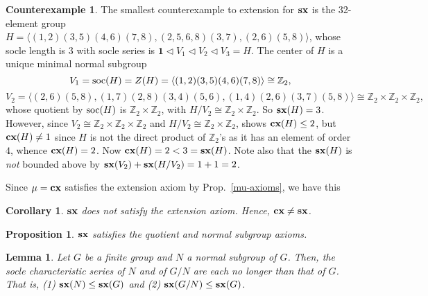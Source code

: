 \documentclass[a4paper,11pt]{amsart}
\newtheorem{lemma}[theorem]{Lemma}
\newtheorem{proposition}[theorem]{Proposition}
\newtheorem{corollary}[theorem]{Corollary}
\theoremstyle{definition}
\newtheorem{counterexample}[example]{Counterexample}
\newcommand{\cx}{\mbox{\bf cx}}
\newcommand{\sx}{{\bf sx}}
\newcommand{\soc}{\mbox{\rm soc}}
\newcommand{\Z}{\mathbb{Z}}
\newcommand{\1}{{\mathbf 1}}
\begin{document}
\begin{counterexample}
The smallest counterexample to extension for $\sx$ is the 32-element group 
$H=\langle (1,2)(3,5)(4,6)
      (7,8), (2,5,6,8)(3,7), (2,6)(5,8)\rangle$, whose 
 socle length is $3$ with socle series is $\1 \lhd V_1 \lhd V_2 \lhd V_3=H$. 
 The center of $H$ is a unique minimal normal subgroup $$V_1=\soc(H)=Z(H)=\langle (1,2)(3,5)(4,6)(7,8)\rangle\cong \Z_2,$$
      $$V_2=\langle (2,6)(5,8), (1,7)(2,8)(3,4)(5,6), (1,4)(2,6)(3,7)(5,8)\rangle\cong \Z_2\times\Z_2\times \Z_2,$$ whose quotient by $\soc(H)$ is $\Z_2\times \Z_2$, with $H/V_2\cong \Z_2\times \Z_2$. So $\sx(H)=3$.
      However, since
	$V_2\cong \Z_2\times\Z_2\times \Z_2$ and $H/V_2\cong\Z_2\times \Z_2$, shows $\cx(H)\leq 2$,
	 but $\cx(H)\neq 1$ since $H$ is not the direct product of $\Z_2$'s as it has an element of order $4$, whence $\cx(H)=2$.
	Now $\cx(H)=2<3=\sx(H)$. Note also that the $\sx(H)$ is {\em not} bounded above by $\sx(V_2)+\sx(H/V_2)=1+1=2$.
\end{counterexample}
Since $\mu=\cx$ satisfies the extension axiom by Prop.~\ref{mu-axioms}, we have this
\begin{corollary}\label{spx-no-ext}
$\sx$ does not satisfy the extension axiom.  Hence, $\cx\neq \sx$.
\end{corollary}
\begin{proposition}


$\sx$ satisfies the quotient and normal subgroup axioms.
\end{proposition}

 
\begin{lemma} Let $G$ be a finite group and $N$
a normal subgroup of $G$.   
Then, the socle characteristic series of $N$ and  of $G/N$
are each no longer than that of $G$.
That is, (1) $\sx(N) \leq \sx(G)$  and (2) $\sx(G/N) \leq \sx(G)$.
\end{lemma}
\end{document}

